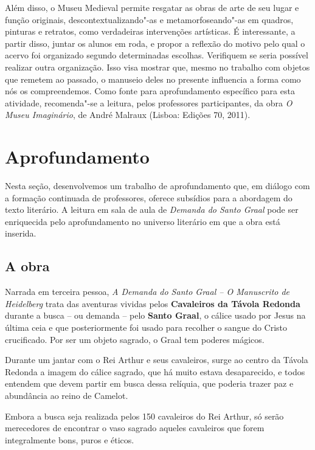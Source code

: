 \documentclass[11pt]{extarticle}
\begin{document}
Além disso, o Museu Medieval permite resgatar as obras de arte de seu
lugar e função originais, descontextualizando"-as e metamorfoseando"-as em
quadros, pinturas e retratos, como verdadeiras intervenções artísticas.
É interessante, a partir disso, juntar os alunos em roda, e propor a
reflexão do motivo pelo qual o acervo foi organizado segundo
determinadas escolhas. Verifiquem se seria possível realizar outra
organização. Isso visa mostrar que, mesmo no trabalho com objetos que
remetem ao passado, o manuseio deles no presente influencia a forma como
nós os compreendemos. Como fonte para aprofundamento específico para
esta atividade, recomenda"-se a leitura, pelos professores participantes,
da obra \emph{O Museu Imaginário}, de André Malraux (Lisboa: Edições 70,
2011).

\section{Aprofundamento}


Nesta seção, desenvolvemos um trabalho de aprofundamento que, em diálogo
com a formação continuada de professores, oferece subsídios para a
abordagem do texto literário. A leitura em sala de aula de \emph{Demanda
do Santo Graal} pode ser enriquecida pelo aprofundamento no universo
literário em que a obra está inserida.

\subsection{A obra}

Narrada em terceira pessoa, \emph{A Demanda do Santo Graal -- O
Manuscrito de Heidelberg} trata das aventuras vividas pelos
\textbf{Cavaleiros da Távola Redonda} durante a busca -- ou demanda --
pelo \textbf{Santo Graal}, o cálice usado por Jesus na última ceia e que
posteriormente foi usado para recolher o sangue do Cristo crucificado.
Por ser um objeto sagrado, o Graal tem poderes mágicos.

Durante um jantar com o Rei Arthur e seus cavaleiros, surge ao centro da
Távola Redonda a imagem do cálice sagrado, que há muito estava
desaparecido, e todos entendem que devem partir em busca dessa relíquia,
que poderia trazer paz e abundância ao reino de Camelot.




Embora a busca seja realizada pelos 150 cavaleiros do Rei Arthur, só
serão merecedores de encontrar o vaso sagrado aqueles cavaleiros que
forem integralmente bons, puros e éticos.
\end{document}
